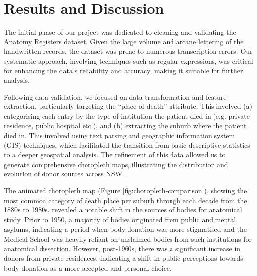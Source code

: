 \section{Results and Discussion}

The initial phase of our project was dedicated to cleaning and validating the Anatomy Registers dataset. Given the large volume and arcane lettering of the handwritten records, the dataset was prone to numerous transcription errors. Our systematic approach, involving techniques such as regular expressions, was critical for enhancing the data's reliability and accuracy, making it suitable for further analysis. 

Following data validation, we focused on data transformation and feature extraction, particularly targeting the ``place of death'' attribute. This involved (a) categorising each entry by the type of institution the patient died in (e.g. private residence, public hospital etc.), and (b) extracting the suburb where the patient died in. This involved using text parsing and geographic information system (GIS) techniques, which facilitated the transition from basic descriptive statistics to a deeper geospatial analysis. The refinement of this data allowed us to generate comprehensive choropleth maps, illustrating the distribution and evolution of donor sources across NSW. 

The animated choropleth map (Figure \ref{fig:choropleth-comparison}), showing the most common category of death place per suburb through each decade from the 1880s to 1980s, revealed a notable shift in the sources of bodies for anatomical study. Prior to 1950, a majority of bodies originated from public and mental asylums, indicating a period when body donation was more stigmatised and the Medical School was heavily reliant on unclaimed bodies from such institutions for anatomical dissection. However, post-1960s, there was a significant increase in donors from private residences, indicating a shift in public perceptions towards body donation as a more accepted and personal choice. 

